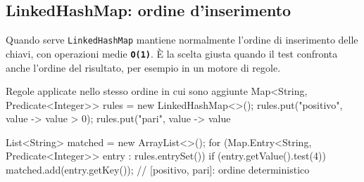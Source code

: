 ﻿\documentclass[10pt,a4paper]{article}
\newcommand{\cmd}[1]{\texttt{#1}}
\newcommand{\complexity}[1]{\textcolor{accent}{\texttt{\textbf{#1}}}}
\newcommand{\topicsubsection}[1]{\Needspace{10\baselineskip}\subsection{#1}}
\newenvironment{topicblock}{%
  \par\medskip\noindent\begin{minipage}{\textwidth}%
}{%
  \end{minipage}\par\medskip%
}
\begin{document}
\begin{topicblock}
\topicsubsection{LinkedHashMap: ordine d'inserimento}
\begin{difference}{Quando serve}
\cmd{LinkedHashMap} mantiene normalmente l'ordine di inserimento delle
chiavi, con operazioni medie \complexity{O(1)}. È la scelta giusta quando il
test confronta anche l'ordine del risultato, per esempio in un motore di
regole.
\end{difference}

\begin{codebox}{Regole applicate nello stesso ordine in cui sono aggiunte}
Map<String, Predicate<Integer>> rules = new LinkedHashMap<>();
rules.put("positivo", value -> value > 0);
rules.put("pari", value -> value %

List<String> matched = new ArrayList<>();
for (Map.Entry<String, Predicate<Integer>> entry : rules.entrySet()) {
    if (entry.getValue().test(4)) {
        matched.add(entry.getKey());
    }
}
// [positivo, pari]: ordine deterministico
\end{codebox}
\end{topicblock}
\end{document}

